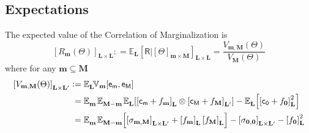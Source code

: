 \documentclass[preprint,12pt]{elsarticle}
\newcommand*{\M}[1]{\ensuremath{#1}\xspace}
\newcommand*{\x}{\times}
\newcommand*{\mi}[1]{\mathbf{#1}}
\newcommand*{\rv}[1]{\mathsf{#1}}
\newcommand*{\te}[2][]{\left\lbrack{#2}\right\rbrack_{#1}}
\newcommand*{\deq}{\M{\mathrel{\mathop:}=}}
\newcommand*{\ev}[3][]{\mathbb{E}_{#3}^{#1}\!\left\lbrack{#2}\right\rbrack}
\newcommand*{\evt}[3][]{\mathbb{E}_{#3}^{#1}\!#2}
\newcommand*{\cov}[3][]{\ifthenelse{\equal{#1}{}}{\mathbb{V}_{#3}\!\left\lbrack{#2}\right\rbrack}{\mathbb{V}_{#3}\!\left\lbrack{#2,#1}\right\rbrack}}
\begin{document}
    \subsection{Expectations} \label{sub:CorOfMarg:Expectations}
    The expected value of the Correlation of Marginalization is
    \begin{equation*}
        \te[\mi{L}\x\mi{L}]{R_\mi{m}(\Theta)} 
        \deq 
        \evt{\te[\mi{L}\x\mi{L}]{\rv{R} \big\vert \te[\mi{m}\x\mi{M}]{\Theta}}}{\mi{L}} =
        \frac
        {V_{\mi{m, M}}(\Theta)}
        {V_{\mi{M}}(\Theta)}
    \end{equation*}
    where for any $\mi{m}\subseteq\mi{M}$
    \begin{equation*}
        \begin{aligned}
            \te[\mi{L\x L^{\prime}}]{V_{\mi{m},\mi{M}}(\Theta)} &\deq \evt{\cov[\rv{e_{M}}]{\rv{e_{m}}}{\mi{m}}}{\mi{L}} \\
            &\phantom{:}= \evt{\;\evt{\;\ev{\te[\mi{L}]{\rv{c_{m}} + f_{\mi{m}}} \otimes \te[\mi{L^{\prime}}]{\rv{c_{M}} + f_{\mi{M}}}}{\mi{L}}}{\mi{M-m}}}{\mi{m}} - \ev{\te[\mi{L}]{\rv{c_{0}} + f_{\mi{0}}}^{2}}{\mi{L}} \\
            &\phantom{:}= \evt{\;\ev{\te[\mi{L\x L^{\prime}}]{\sigma_{\mi{m,M}}} + \te[\mi{L}]{f_{\mi{m}}}\te[\mi{L}]{f_{\mi{M}}}}{\mi{M-m}}}{\mi{m}} - \te[\mi{L\x L^{\prime}}]{\sigma_{\mi{0,0}}} - \te[\mi{L}]{f_{\mi{0}}}^{2}\\
        \end{aligned}
    \end{equation*}

\end{document}
